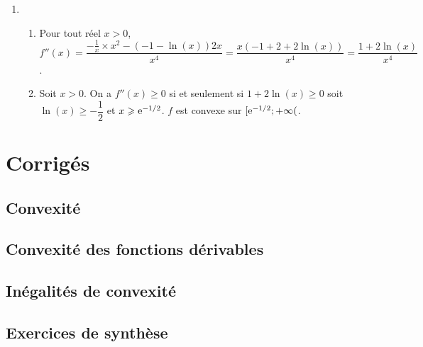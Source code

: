 \documentclass[11pt,fleqn, openany]{book} %
\begin{document}
\begin{solution}
\begin{enumerate}
\item 
\begin{enumerate}
\item Pour tout réel $x>0$, $f''(x)= \dfrac{-\frac{1}{x} \times x^2 -(-1-\ln(x))2x}{x^4}=\dfrac{x(-1+2+2\ln(x))}{x^4}=\dfrac{1+2\ln(x)}{x^4}$.
\item Soit $x>0$. On a $f''(x) \geqslant 0$ si et seulement si $1+2\ln(x) \geqslant 0$ soit $\ln(x)\geqslant -\dfrac{1}{2}$ et $x\geqslant \mathrm{e}^{-1/2}$. $f$ est convexe sur $[\mathrm{e}^{-1/2};+\infty($.
\end{enumerate}
\end{enumerate}

\end{solution}





\chapter{Corrigés}

\section*{Convexité}

\printsolutions[collection={cvx01}, headings={false} ]

\section*{Convexité des fonctions dérivables}

\printsolutions[collection={cvx02}, headings={false} ]


\section*{Inégalités de convexité}

\printsolutions[collection={cvx03}, headings={false} ]

\section*{Exercices de synthèse}

\printsolutions[collection={cvx04}, headings={false} ]
\end{document}
